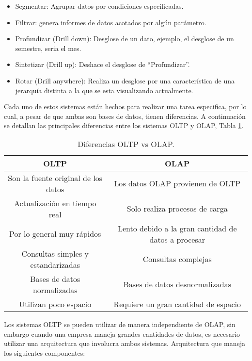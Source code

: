 \begin{enumerate}
\begin{itemize}
    \item Segmentar: Agrupar datos por condiciones especificadas.\\
    \item Filtrar: genera informes de datos acotados por algún parámetro.\\
    \item Profundizar (Drill down): Desglose de un dato, ejemplo, el desglose de un semestre, seria el mes.\\
    \item Sintetizar (Drill up): Deshace el desglose de ``Profundizar''.\\
    \item Rotar (Drill anywhere): Realiza un desglose por una característica de una jerarquía distinta a la que se esta visualizando actualmente.\\
    
\end{itemize}
    
\end{enumerate}

Cada uno de estos sistemas están hechos para realizar una tarea especifica, por lo cual, a pesar de que ambas son bases de datos, tienen diferencias. A continuación se detallan las principales diferencias entre los sistemas OLTP y OLAP, Tabla \ref{tabla:oltpvsolap}. 

\begin{table}[H]
\centering
\begin{tabular}{|c|c|}
\hline
OLTP & OLAP\\ \hline
Son la fuente original de los datos & Los datos OLAP provienen de OLTP \\ \hline
Actualización en tiempo real &	Solo realiza procesos de carga \\ \hline
Por lo general muy rápidos & Lento debido a la gran cantidad de datos a procesar \\ \hline
Consultas simples y estandarizadas & Consultas complejas \\ \hline
Bases de datos normalizadas &	Bases de datos desnormalizadas \\ \hline
Utilizan poco espacio & Requiere un gran cantidad de espacio \\ \hline
\end{tabular}\newline
\caption{Diferencias OLTP vs OLAP. \cite{tablaolapvsoltp}}
\label{tabla:oltpvsolap}
\end{table}

Los sistemas OLTP se pueden utilizar de manera independiente de OLAP, sin embargo cuando una empresa maneja grandes cantidades de datos, es necesario utilizar una arquitectura que involucra ambos sistemas. Arquitectura que maneja los siguientes componentes:


